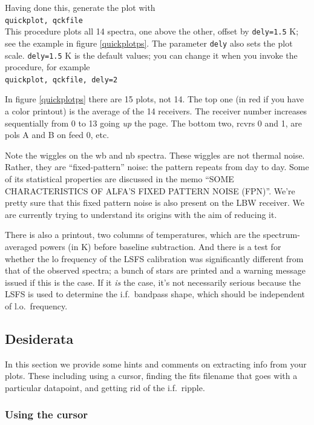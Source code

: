 \documentclass[psfig,preprint]{aastex}
\begin{document}
	Having done this, generate the plot with \\
\verb$quickplot, qckfile$ \\
This procedure plots all 14 spectra, one above the other, offset by
\verb$dely=1.5$ K; see the example in figure \ref{quickplotps}. The parameter
\verb$dely$ also sets the plot scale.  
\verb$dely=1.5$ K is the default values; you can change it when you invoke the
procedure, for example \\
\verb$quickplot, qckfile, dely=2$ 
	
	In figure \ref{quickplotps} there are 15 plots, not 14. The top
one (in red if you have a color printout) is the average of the 14
receivers. The receiver number increases sequentially from 0 to 13 going
{\it up} the page. The bottom two, rcvrs 0 and 1, are pols A and B on
feed 0, etc. 

	Note the wiggles on the wb and nb spectra.  These wiggles are
not thermal noise.  Rather, they are ``fixed-pattern'' noise: the
pattern repeats from day to day.  Some of its statistical properties are
discussed in the memo ``SOME CHARACTERISTICS OF ALFA'S FIXED PATTERN
NOISE (FPN)''.  We're pretty sure that this fixed pattern noise is also
present on the LBW receiver. We are currently trying to understand its
origins with the aim of reducing it. 

	There is also a printout, two columns of temperatures, which
are the spectrum-averaged powers (in K) before baseline subtraction. And
there is a test for whether the lo frequency of the LSFS calibration was
significantly different from that of the observed spectra; a bunch of
stars are printed and a warning message issued if this is the case. If
it {\it is} the case, it's not necessarily serious because the LSFS is used
to determine the i.f.\ bandpass shape, which should be independent of
l.o.\ frequency.

\subsection{Desiderata}
\label{desiderata}

	In this section we provide some hints and comments on extracting
info from your plots.  These including using a cursor, finding the fits
filename that goes with a particular datapoint, and getting rid of the
i.f.\ ripple. 

\subsubsection{Using the cursor}
\end{document}
